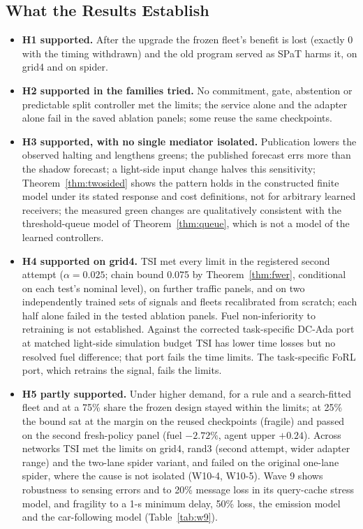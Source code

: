 \subsection{What the Results Establish}
\begin{itemize}\setlength\itemsep{1pt}
\item \textbf{H1 supported.} After the upgrade the frozen fleet's benefit is lost (exactly 0 with the timing withdrawn) and the old program
served as SPaT harms it, on grid4 and on spider.
\item \textbf{H2 supported in the families tried.} No commitment, gate, abstention or predictable split controller met the limits; the
service alone and the adapter alone fail in the saved ablation panels; some reuse the same checkpoints.
\item \textbf{H3 supported, with no single mediator isolated.} Publication lowers the observed halting and lengthens greens; the published
forecast errs more than the shadow forecast; a light-side input change halves this sensitivity; Theorem~\ref{thm:twosided} shows the
pattern holds in the constructed finite model under its stated response and cost definitions, not for arbitrary learned receivers; the measured green changes are qualitatively consistent with the threshold-queue model of
Theorem~\ref{thm:queue}, which is not a model of the learned controllers.
\item \textbf{H4 supported on grid4.} TSI met every limit in the registered second attempt ($\alpha=0.025$; chain bound 0.075 by
Theorem~\ref{thm:fwer}, conditional on each test's nominal level), on further traffic panels, and on two independently trained sets of
signals and fleets recalibrated from scratch; each half alone failed in the tested ablation panels. Fuel non-inferiority to retraining is
not established. Against the corrected task-specific DC-Ada port at matched light-side simulation budget TSI has lower time losses but no
resolved fuel difference; that port fails the time limits. The task-specific FoRL port, which retrains the signal, fails the limits.
\item \textbf{H5 partly supported.} Under higher demand, for a rule and a search-fitted fleet and at a 75\% share the frozen design stayed
within the limits; at 25\% the bound sat at the margin on the reused checkpoints (fragile) and passed on the second fresh-policy panel
(fuel $-2.72\%$, agent upper $+0.24$). Across networks TSI met the limits on grid4, rand3 (second attempt, wider adapter range) and the
two-lane spider variant, and failed on the original one-lane spider, where the cause is not isolated (W10-4, W10-5). Wave 9 shows
robustness to sensing errors and to 20\% message loss in its query-cache stress model, and fragility to a 1-s minimum delay, 50\% loss,
the emission model and the car-following model (Table~\ref{tab:w9}).
\end{itemize}

